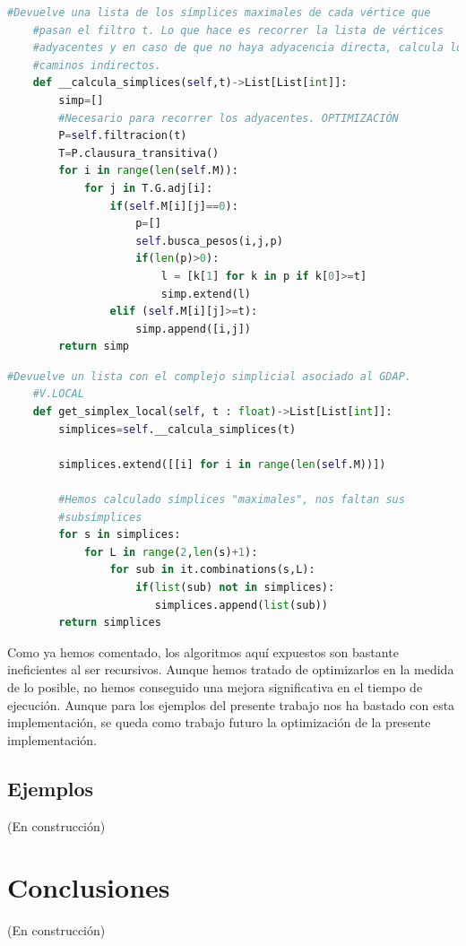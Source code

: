 \documentclass[12pt, a4paper, twoside]{book}
\numberwithin{equation}{section}
\theoremstyle{definition}
\theoremstyle{remark}
\theoremstyle{plain}
\begin{document}
	\begin{lstlisting}[language=Python, float=htbp, caption=Función para 
	el cálculo de símplices maximales (local), label=cod:DefSML]
	#Devuelve una lista de los símplices maximales de cada vértice que 
	#pasan el filtro t. Lo que hace es recorrer la lista de vértices 
	#adyacentes y en caso de que no haya adyacencia directa, calcula los 
	#caminos indirectos.
	def __calcula_simplices(self,t)->List[List[int]]:
        simp=[]
        #Necesario para recorrer los adyacentes. OPTIMIZACIÓN
        P=self.filtracion(t)
        T=P.clausura_transitiva()
        for i in range(len(self.M)):
            for j in T.G.adj[i]:
                if(self.M[i][j]==0):
                    p=[]
                    self.busca_pesos(i,j,p)
                    if(len(p)>0):
                        l = [k[1] for k in p if k[0]>=t]
                        simp.extend(l)
                elif (self.M[i][j]>=t):
                    simp.append([i,j])
        return simp
	\end{lstlisting}

	\begin{lstlisting}[language=Python,float=htbp, caption= Función para 
	el cálculo de todos los símplices (local), label=cod:DefSL]
	#Devuelve un lista con el complejo simplicial asociado al GDAP. 
	#V.LOCAL
	def get_simplex_local(self, t : float)->List[List[int]]:
        simplices=self.__calcula_simplices(t)
        
        simplices.extend([[i] for i in range(len(self.M))])
        
        #Hemos calculado símplices "maximales", nos faltan sus 
        #subsímplices
        for s in simplices:
            for L in range(2,len(s)+1):
                for sub in it.combinations(s,L):
                    if(list(sub) not in simplices):
                       simplices.append(list(sub))
        return simplices
	\end{lstlisting}

	Como ya hemos comentado, los algoritmos aquí expuestos son bastante 
	ineficientes al ser recursivos. Aunque hemos tratado de optimizarlos 
	en la medida de lo posible, no hemos conseguido una mejora 
	significativa en el tiempo de ejecución. Aunque para los ejemplos del 
	presente trabajo nos ha bastado con esta implementación, se queda como
	trabajo futuro la optimización de la presente implementación.
	
	\section{Ejemplos}
	(En construcción)
	\chapter{Conclusiones}
	(En construcción)
	\nocite{*}
	
	
\end{document}
